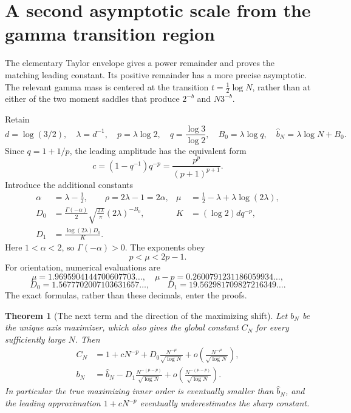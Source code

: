 \documentclass[11pt]{article}
\numberwithin{equation}{section}
\newtheorem{theorem}{Theorem}[section]
\theoremstyle{definition}
\theoremstyle{remark}
\begin{document}

\section{A second asymptotic scale from the gamma transition region}
\label{eul:sec:second-scale}
The elementary Taylor envelope gives a power remainder and proves the
matching leading constant.  Its positive remainder has a more precise
asymptotic.  The relevant gamma mass is centered at the transition
$t=\tfrac12\log N$, rather than at either of the two moment saddles
that produce $2^{-b}$ and $N3^{-b}$.

Retain
\[
 d=\log(3/2),\quad \lambda=d^{-1},\quad p=\lambda\log2,
 \quad q=\frac{\log3}{\log2},\quad
 B_0=\lambda\log q,\quad
 \widehat b_N=\lambda\log N+B_0.
\]
Since $q=1+1/p$, the leading amplitude has the equivalent form
\begin{equation}\label{eul:eq:c-simplified}
 c=(1-q^{-1})q^{-p}=\frac{p^p}{(p+1)^{p+1}}.
\end{equation}
Introduce the additional constants
\begin{align}
 \alpha&=\lambda-\tfrac12,\qquad \rho=2\lambda-1=2\alpha,
 &\mu&=\tfrac12-\lambda+\lambda\log(2\lambda),\label{eul:eq:mu}\\
 D_0&=\frac{\Gamma(-\alpha)}2
       \sqrt{\frac{2\lambda}{\pi}}(2\lambda)^{-B_0},
 &K&=(\log2)dq^{-p},\label{eul:eq:second-amplitudes}\\
 D_1&=\frac{\log(2\lambda)D_0}{K}.
 \nonumber
\end{align}
Here $1<\alpha<2$, so $\Gamma(-\alpha)>0$.
The exponents obey
\begin{equation}\label{eul:eq:exponent-order}
 p<\mu<2p-1.
\end{equation}
For orientation, numerical evaluations are
\[
 \mu=1.9695904144700607703\ldots,\quad
 \mu-p=0.2600791231186059934\ldots,
\]
\[
 D_0=1.5677702007103631657\ldots,\qquad
 D_1=19.562981709827216349\ldots.
\]
The exact formulas, rather than these decimals, enter the proofs.

\begin{theorem}[The next term and the direction of the maximizing shift]
\label{eul:thm:second-term}
Let $b_N$ be the unique axis maximizer, which also gives the global
constant $C_N$ for every sufficiently large $N$.  Then
\begin{align}
 C_N&=1+cN^{-p}
       +D_0\frac{N^{-\mu}}{\sqrt{\log N}}
       +o\!\left(\frac{N^{-\mu}}{\sqrt{\log N}}\right),
       \label{eul:eq:CN-second}\\
 b_N&=\widehat b_N
       -D_1\frac{N^{-(\mu-p)}}{\sqrt{\log N}}
       +o\!\left(\frac{N^{-(\mu-p)}}{\sqrt{\log N}}\right).
       \label{eul:eq:bN-second}
\end{align}
In particular the true maximizing inner order is eventually smaller
than $\widehat b_N$, and the leading approximation
$1+cN^{-p}$ eventually underestimates the sharp constant.
\end{theorem}
\end{document}
